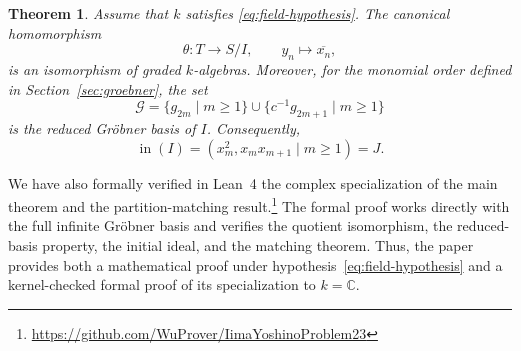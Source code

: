 \documentclass[11pt,reqno]{amsart}
\makeatletter
\newtheorem{theorem}{Theorem}[section]
\theoremstyle{definition}
\theoremstyle{remark}
\theoremstyle{plain}
\renewcommand{\paragraph}{%
  \@startsection{paragraph}{4}{\z@}%
    {1.25ex \@plus .5ex \@minus .2ex}%
    {-1em}%
    {\normalfont\normalsize\bfseries}}
\newcommand{\lm}{\operatorname{lm}}
\newcommand{\inideal}{\operatorname{in}}
\makeatother
\begin{document}
\begin{theorem}\label{thm:main}
Assume that \(k\) satisfies \eqref{eq:field-hypothesis}.  The canonical
homomorphism
\begin{equation}\label{eq:canonical-map}
  \theta:T\longrightarrow S/I,
  \qquad
  y_n\longmapsto\overline{x_n},
\end{equation}
is an isomorphism of graded \(k\)-algebras.  Moreover, for the monomial
order defined in Section~\ref{sec:groebner}, the set
\begin{equation}\label{eq:G-definition}
  \mathcal G=
  \{g_{2m}\mid m\geq1\}
  \cup
  \{c^{-1}g_{2m+1}\mid m\geq1\}
\end{equation}
is the reduced Gr\"obner basis of \(I\).  
Consequently,
\begin{equation}\label{eq:initial-ideal}
  \inideal(I)=(x_m^2,x_mx_{m+1}\mid m\geq1)=J.
\end{equation}
\end{theorem}



We have also formally verified in Lean~4 the complex specialization of
the main theorem and the partition-matching result.\footnote{\url{https://github.com/WuProver/IimaYoshinoProblem23}}
The formal proof works directly with the full infinite Gr\"obner basis and verifies the quotient
isomorphism, the reduced-basis property, the initial ideal, and the
matching theorem. Thus, the paper provides both a mathematical proof
under hypothesis~\eqref{eq:field-hypothesis} and a kernel-checked
formal proof of its specialization to \(k=\mathbb C\).


\end{document}
